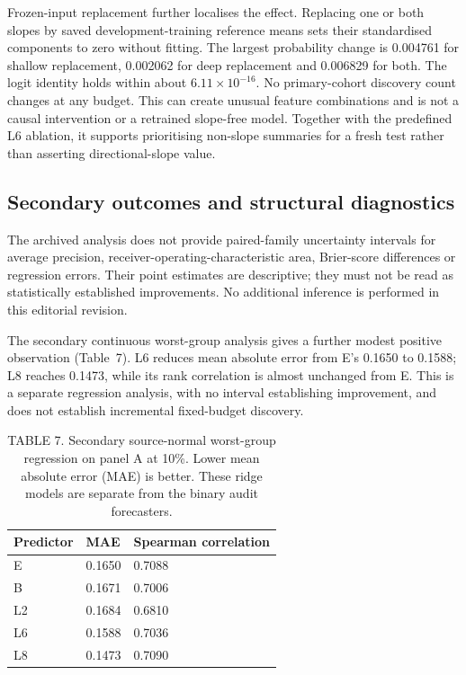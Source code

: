 Frozen-input replacement further localises the effect. Replacing one or both slopes by saved development-training reference means sets their standardised components to zero without fitting. The largest probability change is 0.004761 for shallow replacement, 0.002062 for deep replacement and 0.006829 for both. The logit identity holds within about $6.11\times10^{-16}$. No primary-cohort discovery count changes at any budget. This can create unusual feature combinations and is not a causal intervention or a retrained slope-free model. Together with the predefined L6 ablation, it supports prioritising non-slope summaries for a fresh test rather than asserting directional-slope value.

\subsection{Secondary outcomes and structural diagnostics}
The archived analysis does not provide paired-family uncertainty intervals for average precision, receiver-operating-characteristic area, Brier-score differences or regression errors. Their point estimates are descriptive; they must not be read as statistically established improvements. No additional inference is performed in this editorial revision.

The secondary continuous worst-group analysis gives a further modest positive observation (Table~7). L6 reduces mean absolute error from E's 0.1650 to 0.1588; L8 reaches 0.1473, while its rank correlation is almost unchanged from E. This is a separate regression analysis, with no interval establishing improvement, and does not establish incremental fixed-budget discovery.

\begin{table}[t]
\caption{TABLE 7. Secondary source-normal worst-group regression on panel A at 10\%. Lower mean absolute error (MAE) is better. These ridge models are separate from the binary audit forecasters.}
\label{tab:ridge}
\centering\small
\begin{tabular}{lll}
\toprule Predictor & MAE & Spearman correlation\\\midrule
E &0.1650&0.7088\\
B &0.1671&0.7006\\
L2&0.1684&0.6810\\
L6&0.1588&0.7036\\
L8&0.1473&0.7090\\\bottomrule
\end{tabular}
\end{table}

